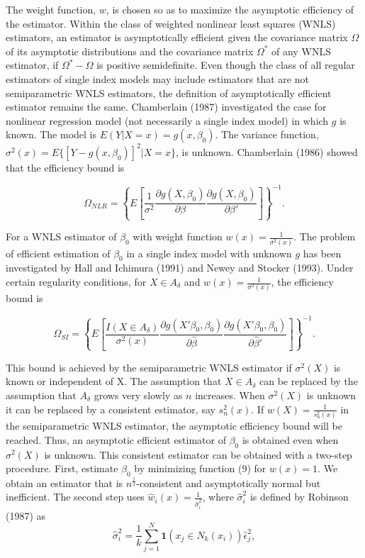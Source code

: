 \documentclass[a4paper]{article}
\begin{document}
The weight function, $w$, is chosen so as to maximize the asymptotic efficiency of the estimator. Within the class of weighted nonlinear least squares (WNLS) estimators, an estimator is asymptotically efficient given the covariance matrix $\Omega$ of its asymptotic distributions and the covariance matrix $\Omega^*$ of any WNLS estimator, if $\Omega^* - \Omega$ is positive semidefinite. Even though the class of all regular estimators of single index models may include estimators that are not semiparametric WNLS estimators, the definition of asymptotically efficient estimator remains the same. Chamberlain (1987) investigated the case for nonlinear regression model (not necessarily a single index model) in which $g$ is known. The model is $E(Y|X = x) = g(x, \beta_0)$. The variance function, $\sigma^2(x) = E\{[Y - g(x, \beta_0)]^2| X = x\}$, is unknown. Chamberlain (1986) showed that the efficiency bound is 

\[ \Omega_{NLR} = \left\{E\left[\frac{1}{\sigma^2}\frac{\partial g(X, \beta_0)}{\partial \beta} \frac{\partial g(X, \beta_0)}{\partial \beta'}\right]\right\}^{-1}. \]

For a WNLS estimator of $\beta_0$ with weight function $w(x) = \frac{1}{\sigma^2(x)}$. The problem of efficient estimation of $\beta_0$ in a single index model with unknown $g$ has been investigated by Hall and Ichimura (1991) and Newey and Stocker (1993). Under certain regularity conditions, for $X \in A_{\delta}$ and $w(x) = \frac{1}{\sigma^2(x)}$, the efficiency bound is

\begin{equation}
\Omega_{SI} = \left\{ E\left[\frac{I(X \in A_{\delta})}{\sigma^2(x)}\frac{\partial g(X'\beta_0, \beta_0)}{\partial \hat{\beta}}\frac{\partial g(X'\beta_0, \beta_0)}{\partial \hat{\beta}'}\right] \right\}^{-1}.
\end{equation}


This bound is achieved by the semiparametric WNLS estimator if $\sigma^2(X)$ is known or independent of X. The assumption that $X \in A_{\delta}$ can be replaced by the assumption that $A_{\delta}$ grows very slowly as $n$ increases. When $\sigma^2(X)$ is unknown it can be replaced by a consistent estimator, say $s_{n}^{2}(x)$. If $w(X) = \frac{1}{s_{n}^{2}(x)}$ in the semiparametric WNLS estimator, the asymptotic efficiency bound will be reached. Thus, an asymptotic efficient estimator of $\beta_0$ is obtained even when $\sigma^2(X)$ is unknown. This consistent estimator can be obtained with a two-step procedure. First, estimate $\beta_0$ by minimizing function (9) for $w(x) = 1$. We obtain an estimator that is $n^{\frac{1}{2}}$-consistent and asymptotically normal but inefficient. The second step uses $\hat{w}_i(x) = \frac{1}{\hat{\sigma}_{i}^{2}}$, where  $\hat{\sigma}_{i}^{2}$ is defined by Robinson (1987) as 
\[\hat{\sigma}_{i}^{2} = \frac{1}{k}\sum_{j=1}^{N} \mathbf{1}{(x_j \in N_k(x_i))}\hat{\epsilon}_{j}^{2} ,\]
\end{document}
